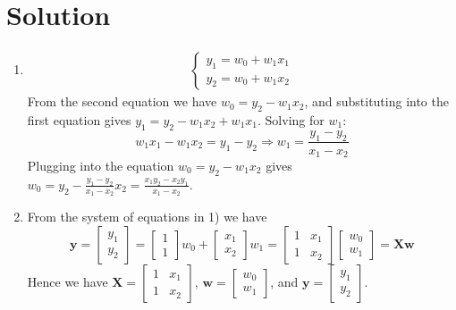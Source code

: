 \documentclass{harvardml}
\theoremstyle{definition}
\theoremstyle{plain}
\newenvironment{solution}
  {\color{blue}\section*{Solution}}
{}
\begin{document}
\begin{solution}
\begin{enumerate}
    \item 
        \begin{equation*}
        \begin{split}
            \begin{cases}
                y_1 = w_0 + w_1x_1 \\
                y_2 = w_0 + w_1x_2
            \end{cases}
        \end{split}
        \end{equation*}
        From the second equation we have $ w_0 = y_2 - w_1x_2$, and substituting into the first equation gives $y_1 = y_2 -w_1x_2 + w_1x_1$. Solving for $w_1:$
        \begin{equation*}
            w_1x_1 - w_1x_2 = y_1-y_2 \Rightarrow w_1 = \boxed{\frac{y_1 - y_2}{x_1-x_2}}
        \end{equation*}
        Plugging into the equation $ w_0 = y_2 - w_1x_2$ gives $w_0 = y_2 - \frac{y_1 - y_2}{x_1-x_2}x_2 = \boxed{\frac{x_1y_2-x_2y_1}{x_1-x_2}}$. 
    \item From the system of equations in 1) we have
        \begin{equation*}
            \mathbf{y} = \begin{bmatrix} y_1 \\ y_2 \end{bmatrix} = \begin{bmatrix} 1 \\ 1 \end{bmatrix}w_0 + \begin{bmatrix} x_1 \\ x_2 \end{bmatrix}w_1 = \begin{bmatrix} 1 & x_1 \\ 1 & x_2 \end{bmatrix}\begin{bmatrix} w_0 \\ w_1 \end{bmatrix} = \mathbf{X}\mathbf{w}
        \end{equation*}
        Hence we have $\mathbf{X} = \begin{bmatrix} 1 & x_1 \\ 1 & x_2 \end{bmatrix}$, $\mathbf{w} = \begin{bmatrix} w_0 \\ w_1 \end{bmatrix}$, and $\mathbf{y} = \begin{bmatrix} y_1 \\ y_2 \end{bmatrix}$. 
        

\end{enumerate}
\end{solution}
\end{document}
